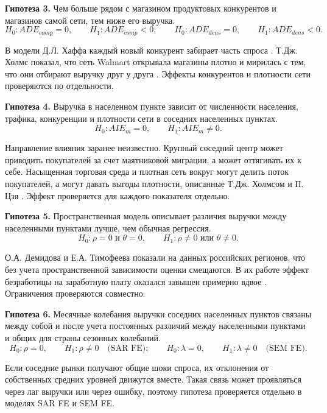 \documentclass[12pt, a4paper]{article}
\begin{document}
\textbf{Гипотеза 3.} Чем больше рядом с магазином продуктовых конкурентов и магазинов самой сети,
тем ниже его выручка.
\[
H_0: ADE_{comp} = 0, \qquad H_1: ADE_{comp} < 0; \qquad
H_0: ADE_{dens} = 0, \qquad H_1: ADE_{dens} < 0.
\]

В модели Д.Л. Хаффа каждый новый конкурент забирает часть спроса \cite{huff1964}. Т.Дж. Холмс
показал, что сеть Walmart открывала магазины плотно и мирилась с тем, что они отбирают выручку
друг у друга \cite{holmes2011}. Эффекты конкурентов и плотности сети проверяются по отдельности.

\textbf{Гипотеза 4.} Выручка в населенном пункте зависит от численности населения, трафика,
конкуренции и плотности сети в соседних населенных пунктах.
\[
H_0: AIE_m = 0, \qquad H_1: AIE_m \ne 0.
\]

Направление влияния заранее неизвестно. Крупный соседний центр может приводить покупателей за
счет маятниковой миграции, а может оттягивать их к себе. Насыщенная торговая среда и плотная сеть
вокруг могут делить поток покупателей, а могут давать выгоды плотности, описанные Т.Дж. Холмсом и
П. Цзя \cite{holmes2011, jia2008}. Эффект проверяется для каждого показателя отдельно.

\textbf{Гипотеза 5.} Пространственная модель описывает различия выручки между населенными
пунктами лучше, чем обычная регрессия.
\[
H_0: \rho = 0 \text{ и } \theta = 0, \qquad H_1: \rho \ne 0 \text{ или } \theta \ne 0.
\]

О.А. Демидова и Е.А. Тимофеева показали на данных российских регионов, что без учета
пространственной зависимости оценки смещаются. В их работе эффект безработицы на заработную плату
оказался завышен примерно вдвое \cite{demidova2021}. Ограничения проверяются совместно.

\textbf{Гипотеза 6.} Месячные колебания выручки соседних населенных пунктов связаны между собой и
после учета постоянных различий между населенными пунктами и общих для страны сезонных колебаний.
\[
H_0: \rho = 0, \qquad H_1: \rho \ne 0 \quad \text{(SAR FE)}; \qquad
H_0: \lambda = 0, \qquad H_1: \lambda \ne 0 \quad \text{(SEM FE)}.
\]

Если соседние рынки получают общие шоки спроса, их отклонения от собственных средних уровней
движутся вместе. Такая связь может проявляться через лаг выручки или через ошибку, поэтому
гипотеза проверяется отдельно в моделях SAR FE и SEM FE.

\clearpage

\end{document}
